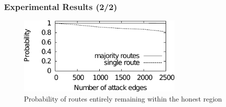 \documentclass{beamer}
\begin{document}

\begin{frame}

  \frametitle{Experimental Results (2/2)}

  \begin{figure}
    \includegraphics[width=8cm]{./pictures/result_sybil_nodes} 
    \caption{Probability of routes entirely remaining within the honest region}
  \end{figure}

\end{frame}


\end{document}
